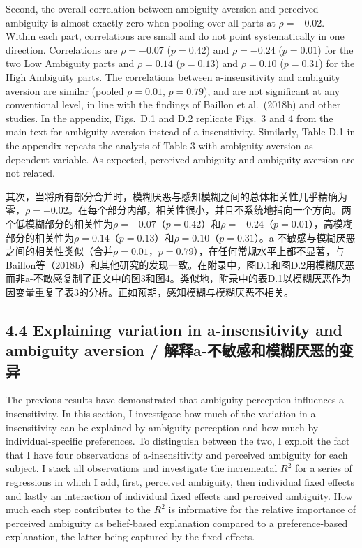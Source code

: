 \documentclass[12pt,a4paper]{article}
\newenvironment{original}
  {\par\medskip\noindent\color{black}\ignorespaces}
  {\par\medskip}
\newenvironment{translation}
  {\par\noindent\color{transblue}\ignorespaces}
  {\par\medskip\medskip}
\begin{document}
\begin{original}
Second, the overall correlation between ambiguity aversion and perceived ambiguity is almost exactly zero when pooling over all parts at $\rho = -0.02$. Within each part, correlations are small and do not point systematically in one direction. Correlations are $\rho = -0.07$ ($p = 0.42$) and $\rho = -0.24$ ($p = 0.01$) for the two Low Ambiguity parts and $\rho = 0.14$ ($p = 0.13$) and $\rho = 0.10$ ($p = 0.31$) for the High Ambiguity parts. The correlations between a-insensitivity and ambiguity aversion are similar (pooled $\rho = 0.01$, $p = 0.79$), and are not significant at any conventional level, in line with the findings of Baillon et al.\ (2018b) and other studies. In the appendix, Figs.\ D.1 and D.2 replicate Figs.\ 3 and 4 from the main text for ambiguity aversion instead of a-insensitivity. Similarly, Table D.1 in the appendix repeats the analysis of Table 3 with ambiguity aversion as dependent variable. As expected, perceived ambiguity and ambiguity aversion are not related.
\end{original}

\begin{translation}
其次，当将所有部分合并时，模糊厌恶与感知模糊之间的总体相关性几乎精确为零，$\rho = -0.02$。在每个部分内部，相关性很小，并且不系统地指向一个方向。两个低模糊部分的相关性为$\rho = -0.07$（$p = 0.42$）和$\rho = -0.24$（$p = 0.01$），高模糊部分的相关性为$\rho = 0.14$（$p = 0.13$）和$\rho = 0.10$（$p = 0.31$）。a-不敏感与模糊厌恶之间的相关性类似（合并$\rho = 0.01$，$p = 0.79$），在任何常规水平上都不显著，与Baillon等（2018b）和其他研究的发现一致。在附录中，图D.1和图D.2用模糊厌恶而非a-不敏感复制了正文中的图3和图4。类似地，附录中的表D.1以模糊厌恶作为因变量重复了表3的分析。正如预期，感知模糊与模糊厌恶不相关。
\end{translation}

\subsection{4.4 Explaining variation in a-insensitivity and ambiguity aversion / 解释a-不敏感和模糊厌恶的变异}

\begin{original}
The previous results have demonstrated that ambiguity perception influences a-insensitivity. In this section, I investigate how much of the variation in a-insensitivity can be explained by ambiguity perception and how much by individual-specific preferences. To distinguish between the two, I exploit the fact that I have four observations of a-insensitivity and perceived ambiguity for each subject. I stack all observations and investigate the incremental $R^2$ for a series of regressions in which I add, first, perceived ambiguity, then individual fixed effects and lastly an interaction of individual fixed effects and perceived ambiguity. How much each step contributes to the $R^2$ is informative for the relative importance of perceived ambiguity as belief-based explanation compared to a preference-based explanation, the latter being captured by the fixed effects.
\end{original}
\end{document}
